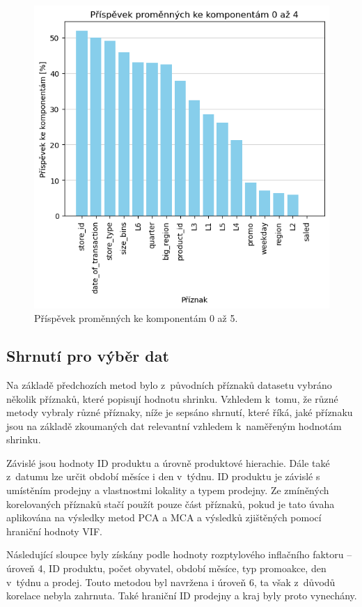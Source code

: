 \begin{figure}[h!]
    \centering
    \includegraphics[width=.6\textwidth]{obrazky/pripravadat/mca-prispevky.png}
    \caption{Příspěvek proměnných ke komponentám 0 až 5.}
    \label{obr:nb:mca_prispevek}
\end{figure}



\subsection*{Shrnutí pro výběr dat}

Na základě předchozích metod bylo z~původních příznaků datasetu 
vybráno několik příznaků, které popisují hodnotu shrinku.
Vzhledem k~tomu, že různé metody vybraly různé příznaky, níže je sepsáno shrnutí, které říká, jaké příznaku jsou na základě zkoumaných dat relevantní vzhledem k~naměřeným hodnotám shrinku. 

Závislé jsou hodnoty ID produktu a úrovně produktové hierachie. Dále také z~datumu lze určit období měsíce i den v~týdnu. ID produktu je závislé s umístěním prodejny a vlastnostmi lokality a typem prodejny.  Ze zmíněných korelovaných příznaků stačí použít pouze část příznaků, pokud je tato úvaha aplikována na výsledky metod PCA a MCA a výsledků zjištěných pomocí hraniční hodnoty VIF.

Následující sloupce byly získány podle hodnoty rozptylového inflačního faktoru -- úroveň 4, ID produktu, počet obyvatel, období měsíce, typ promoakce, den v~týdnu a prodej. Touto metodou byl navržena i úroveň 6, ta však z~důvodů korelace nebyla zahrnuta. Také hraniční ID prodejny a kraj byly proto vynechány. 
    
